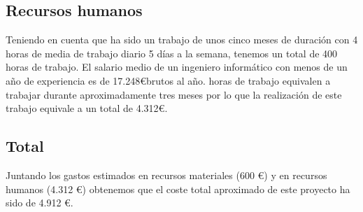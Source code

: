 \subsection{Recursos humanos}

Teniendo en cuenta que ha sido un trabajo de unos cinco meses de duración con 4 horas de media de trabajo diario 5 días a la semana, tenemos un total de 400 horas de trabajo.
\newline
El salario medio de un ingeniero informático con menos de un año de experiencia es de 17.248\euro  brutos al año.
 horas de trabajo equivalen a trabajar durante aproximadamente tres meses por lo que la realización de este trabajo equivale a un total de 4.312\euro.


\subsection{Total}

Juntando los gastos estimados en recursos materiales (600 \euro) y en recursos humanos (4.312 \euro) obtenemos que el coste total aproximado de este proyecto ha sido de 4.912 \euro .


